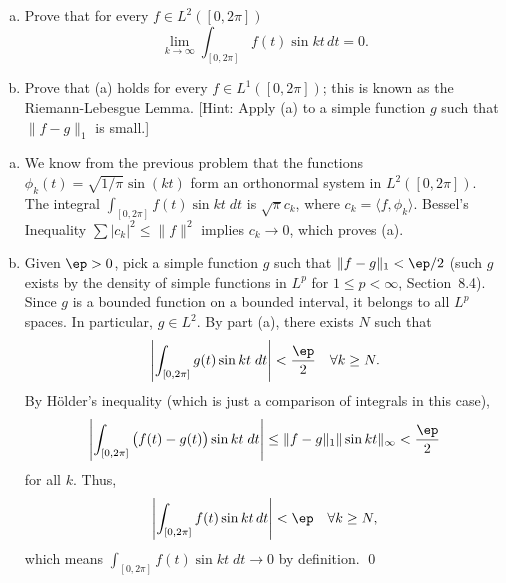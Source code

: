 \begin{hwsol} \hfill
\begin{enumerate}[(a)]
\item Prove that for every $f\in L^2([0, 2\pi])$ 
        \[
        \lim_{k \to \infty} \int_{[0, 2\pi]} f(t)  \sin kt\,dt= 0.
        \]
\item Prove that (a) holds for every $f \in L^1([0, 2\pi])$; this is known as the Riemann-Lebesgue Lemma. [Hint: Apply (a) to a simple function $g$ such that $\|f - g\|_1$ is small.] \\
\end{enumerate}

\pf \hfill
\begin{enumerate}[(a)]
\item We know from the previous problem that the functions $\phi_k(t)= \sqrt{1/\pi} \sin(k t)$ form an orthonormal system in $L^2([0, 2\pi])$. The integral $\int_{[0, 2\pi]} f(t) \sin kt \;dt$ is $\sqrt{\pi} c_k$, where $c_k= \langle f, \phi_k \rangle$. Bessel's Inequality $\sum |c_k|^2 \leq \|f\|^2$ implies $c_k \to 0$, which proves (a). 

\item Given $\ep>0$, pick a simple function $g$ such that $\|f-g\|_1 < \ep/2$ (such $g$ exists by the density of simple functions in $L^p$ for $1 \leq p < \infty$, Section~8.4). Since $g$ is a bounded function on a bounded interval, it belongs to all $L^p$ spaces. In particular, $g \in L^2$. By part (a), there exists $N$ such that 
        \[
        \left| \int_{[0, 2\pi]} g(t) \sin kt \;dt \right| < \dfrac{\ep}{2} \quad \forall k \geq N.
        \]
By H\"older's inequality (which is just a comparison of integrals in this case),
        \[
        \left|  \int_{[0, 2\pi]} \big( f(t) - g(t) \big) \sin kt \;dt \right| \leq \|f - g\|_1 \| \sin kt \|_\infty < \frac{\ep}{2}
        \]
for all $k$. Thus, 
        \[
        \left| \int_{[0, 2\pi]} f(t) \sin kt\,dt \right| < \ep \quad \forall k \geq N,
        \]
which means $ \int_{[0, 2\pi]} f(t) \sin kt \;dt \to 0$ by definition. \qed \\
\end{enumerate}
\end{hwsol}


